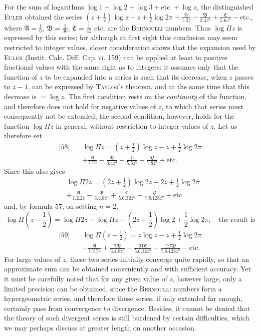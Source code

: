 For the sum of logarithms $\log1+\log2+\log3+\mathrm{etc.}+\log z$, the distinguished \textsc{Euler} obtained the series $(z+\frac12)\log z-z+\frac12\log2\pi
+\frac{\mathfrak A}{1.2z}-\frac{\mathfrak B}{3.4z^3}
+\frac{\mathfrak C}{5.6z^5}-\mathrm{etc.}$, where $\mathfrak A=\frac16$, $\mathfrak B=\frac1{30}$, $\mathfrak C=\frac1{42}$ etc. are the \textsc{Bernoulli} numbers. Thus $\log\Pi z$ is expressed by this series; for although at first sight this conclusion may seem restricted to integer values, closer consideration shows that the expansion used by \textsc{Euler} (Instit. Calc. Diff. Cap.\,\textsc{vi}. 159) can be applied at least to positive fractional values with the same right as to integers: it assumes only that the function of $z$ to be expanded into a series is such that its decrease, when $z$ passes to $z-1$, can be expressed by \textsc{Taylor}'s theorem, and at the same time that this decrease is $=\log z$. The first condition rests on the \emph{continuity} of the function, and therefore does not hold for negative values of $z$, to which that series must consequently not be extended; the second condition, however, holds for the function $\log\Pi z$ in general, without restriction to integer values of $z$. Let us therefore set
\[
\begin{aligned}
{}\text{[58]}\quad &\log\Pi z=(z+\frac12)\log z-z+\frac12\log2\pi\\[4pt]
&+\frac{\mathfrak A}{1.2z}-\frac{\mathfrak B}{3.4z^3}
+\frac{\mathfrak C}{5.6z^5}-\frac{\mathfrak D}{7.8z^7}
+\mathrm{etc.}
\end{aligned}
\]
Since this also gives
\[
\begin{aligned}
&\log\Pi2z=(2z+\frac12)\log2z-2z+\frac12\log2\pi\\[4pt]
&+\frac{\mathfrak A}{1.2.2z}-\frac{\mathfrak B}{3.4.8z^3}
+\frac{\mathfrak C}{5.6.32z^5}-\frac{\mathfrak D}{7.8.128z^7}
+\mathrm{etc.}
\end{aligned}
\]
and, by formula 57, on setting $n=2$,
\[
\log\Pi(z-\frac12)=\log\Pi2z-\log\Pi z
-(2z+\frac12)\log2+\frac12\log2\pi,\quad\text{the result is}
\]
\[
\begin{aligned}
{}\text{[59]}\quad &\log\Pi(z-\frac12)=z\log z-z+\frac12\log2\pi\\[4pt]
&-\frac{\mathfrak A}{1.2.2z}+\frac{7\mathfrak B}{3.4.8z^3}
-\frac{31\mathfrak C}{5.6.32z^5}+\frac{127\mathfrak D}{7.8.128z^7}
-\mathrm{etc.}
\end{aligned}
\]
For large values of $z$, these two series initially converge quite rapidly, so that an approximate sum can be obtained conveniently and with sufficient accuracy. Yet it must be carefully noted that for any given value of $z$, however large, only a limited precision can be obtained, since the \textsc{Bernoulli} numbers form a hypergeometric series, and therefore those series, if only extended far enough, certainly pass from convergence to divergence. Besides, it cannot be denied that the theory of such divergent series is still burdened by certain difficulties, which we may perhaps discuss at greater length on another occasion.
